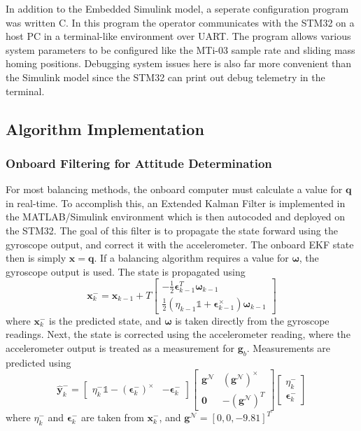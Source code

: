 In addition to the Embedded Simulink model, a seperate configuration program was written C. In this program the operator communicates with the STM32 on a host PC in a terminal-like environment over UART. The program allows various system parameters to be configured like the MTi-03 sample rate and sliding mass homing positions. Debugging system issues here is also far more convenient than the Simulink model since the STM32 can print out debug telemetry in the terminal.

\subsection{Algorithm Implementation}

\subsubsection{Onboard Filtering for Attitude Determination}

For most balancing methods, the onboard computer must calculate a value for $\bm{q}$ in real-time. To accomplish this, an Extended Kalman Filter is implemented in the MATLAB/Simulink environment which is then autocoded and deployed on the STM32. The goal of this filter is to propagate the state forward using the gyroscope output, and correct it with the accelerometer. The onboard EKF state then is simply $\bm{x} = \bm{q}$. If a balancing algorithm requires a value for $\bm{\omega}$, the gyroscope output is used. The state is propagated using
\begin{equation}\label{equation:EKF_process}
    \bm{x}_k^-=\bm{x}_{k-1} + T\begin{bmatrix}
    
    -\frac{1}{2}\bm{\epsilon}_{k-1}^T\bm{\omega}_{k-1} \\
    \frac{1}{2}(\eta_{k-1}\mathbb{1} +
    \bm{\epsilon}_{k-1}^{\times})\bm{\omega}_{k-1}
\end{bmatrix}
\end{equation}
where $\bm{x}_k^-$ is the predicted state, and $\bm{\omega}$ is taken directly from the gyroscope readings. Next, the state is corrected using the accelerometer reading, where the accelerometer output is treated as a measurement for $\bm{g}_b$. Measurements are predicted using 
\begin{equation}\label{equation:EKF_meas}
    \hat{\bm{y}}_k^-=
    \begin{bmatrix}    
    \eta_k^-\mathbb{1}-(\bm{\epsilon}_k^-)^{\times} & -\bm{\epsilon}_k^-
    \end{bmatrix}
    \begin{bmatrix}    
    \bm{g}^\mathcal{N} & (\bm{g}^\mathcal{N})^{\times} \\
    \bm{0} & - (\bm{g}^\mathcal{N})^T
    \end{bmatrix}
    \begin{bmatrix}    
    \eta_k^- \\
    \bm{\epsilon}_k^-
    \end{bmatrix}
\end{equation}
where $\eta_k^-$ and $\bm{\epsilon}_k^-$ are taken from $\bm{x}_k^-$, and $\bm{g}^\mathcal{N}=[0, 0,-9.81]^T$

